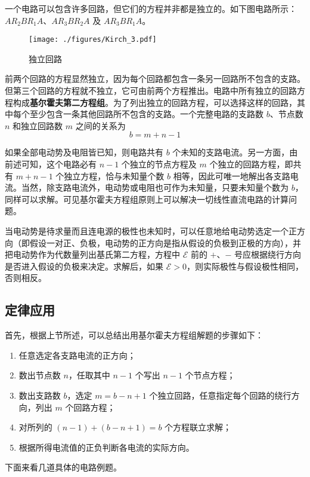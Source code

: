 一个电路可以包含许多回路，但它们的方程并非都是独立的。如下图电路所示：$AR_2BR_1A$、$AR_3BR_2A$ 及 $AR_3BR_1A$。
\begin{figure}[ht]
\centering
\texttt{[image: ./figures/Kirch\_3.pdf]}
\caption{独立回路} \label{Kirch_fig3}
\end{figure}

前两个回路的方程显然独立，因为每个回路都包含一条另一回路所不包含的支路。但第三个回路的方程就不独立，它可由前两个方程推出。电路中所有独立的回路方程构成\textbf{基尔霍夫第二方程组}。为了列出独立的回路方程，可以选择这样的回路，其中每个至少包含一条其他回路所不包含的支路。一个完整电路的支路数 $b$、节点数 $n $ 和独立回路数 $m $ 之间的关系为
\begin{equation}
b=m+n-1
\end{equation}

如果全部电动势及电阻皆已知，则电路共有 $b $ 个未知的支路电流。另一方面，由前述可知，这个电路必有 $n-1 $ 个独立的节点方程及 $m $ 个独立的回路方程，即共有 $m + n -1$ 个独立方程，恰与未知量个数 $b $ 相等，因此可唯一地解出各支路电流。当然，除支路电流外，电动势或电阻也可作为未知量，只要未知量个数为 $b$，同样可以求解。可见基尔霍夫方程组原则上可以解决一切线性直流电路的计算问题。

当电动势是待求量而且连电源的极性也未知时，可以任意地给电动势选定一个正方向（即假设一对正、负极，电动势的正方向是指从假设的负极到正极的方向），并把电动势作为代数量列出基氏第二方程，方程中 $\mathscr E$ 前的 $+$、$-$ 号应根据绕行方向是否进入假设的负极来决定。求解后，如果 $\mathscr E>0$，则实际极性与假设极性相同，否则相反。 

\subsection{定律应用}

首先，根据上节所述，可以总结出用基尔霍夫方程组解题的步骤如下：
\begin{enumerate}
\item 任意选定各支路电流的正方向；
\item 数出节点数 $n$，任取其中 $n-1 $ 个写出 $n - 1 $ 个节点方程；
\item 数出支路数 $b$，选定 $m=b-n+1 $ 个独立回路，任意指定每个回路的绕行方向，列出 $m $ 个回路方程；
\item 对所列的 $(n-1)+(b-n+1)=b $ 个方程联立求解；
\item 根据所得电流值的正负判断各电流的实际方向。
\end{enumerate}

下面来看几道具体的电路例题。

